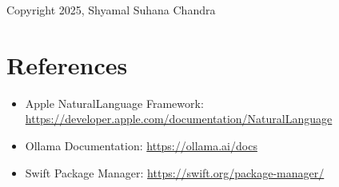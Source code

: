 \documentclass[11pt,a4paper]{article}
\begin{document}
Copyright \textcopyright{} 2025, Shyamal Suhana Chandra

\section{References}

\begin{itemize}
    \item Apple NaturalLanguage Framework: \url{https://developer.apple.com/documentation/NaturalLanguage}
    \item Ollama Documentation: \url{https://ollama.ai/docs}
    \item Swift Package Manager: \url{https://swift.org/package-manager/}
\end{itemize}
\end{document}
